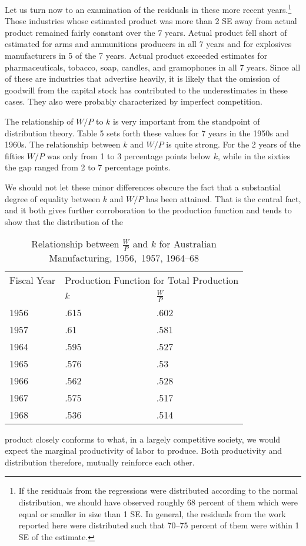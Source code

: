 \documentclass{article}
\begin{document}
Let us turn now to an examination of the residuals in these more recent years.\footnote{If the residuals from the regressions were distributed according to the normal distribution, we should have observed roughly 68 percent of them which were equal or smaller in size than 1 SE. In general, the residuals from the work reported here were distributed such that 70--75 percent of them were within 1 SE of the estimate.} Those industries whose estimated product was more than 2 SE away from actual product remained fairly constant over the 7 years. Actual product fell short of estimated for arms and ammunitions producers in all 7 years and for explosives manufacturers in 5 of the 7 years. Actual product exceeded estimates for pharmaceuticals, tobacco, soap, candles, and gramophones in all 7 years. Since all of these are industries that advertise heavily, it is likely that the omission of goodwill from the capital stock has contributed to the underestimates in these cases. They also were probably characterized by imperfect competition.

The relationship of \(W/P\) to \(k\) is very important from the standpoint of distribution theory. Table 5 sets forth these values for 7 years in the 1950s and 1960s. The relationship between \(k\) and \(W/P\) is quite strong. For the 2 years of the fifties \(W/P\) was only from 1 to 3 percentage points below \(k\), while in the sixties the gap ranged from 2 to 7 percentage points.

We should not let these minor differences obscure the fact that a substantial degree of equality between \(k\) and \(W/P\) has been attained. That is the central fact, and it both gives further corroboration to the production function and tends to show that the distribution of the %
\begin{table}[!t]
\centering
\footnotesize{
\caption{Relationship between \(\frac{W}{P}\) and \(k\) for Australian Manufacturing, 1956,~1957, 1964--68}%
\label{tab5}%
\begin{tabular}{p{}p{}p{}}
\hline
Fiscal Year & \multicolumn{2}{c}{Production Function for Total Production}\\
& \(k\) & \(\frac{W}{P}\)\\
\hline
1956 & .615 & .602\\
1957 & .61 & .581\\
1964 & .595 & .527\\
1965 & .576 & .53\\
1966 & .562 & .528\\
1967 & .575 & .517\\
1968 & .536 & .514\\
\hline
\end{tabular}
}
\end{table}
product closely conforms to what, in a largely competitive society, we would expect the marginal productivity of labor to produce. Both productivity and distribution therefore, mutually reinforce each other.
\end{document}
